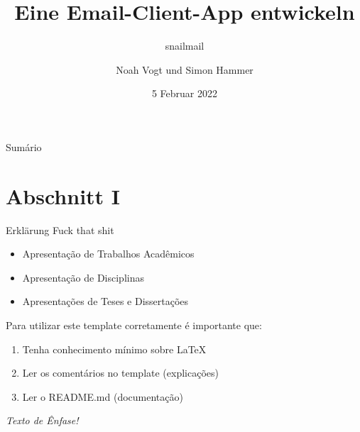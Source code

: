 \documentclass{libs/ufc_format}
\title[\textit{snailmail}]{\textbf{Eine Email-Client-App entwickeln}}
\subtitle{snailmail}
\author{Noah Vogt und Simon Hammer}
\institute[]{
    \ufc
}
\date{5 Februar 2022}
\begin{document}


\begin{frame}{}
    \maketitle
\end{frame}

\begin{frame}{Sumário}
    \begin{multicols}{2}
        \tableofcontents
    \end{multicols}
\end{frame}

\section{Abschnitt I}
\begin{frame}{Erklärung}
    Fuck that shit
    \begin{itemize}
        \item Apresentação de Trabalhos Acadêmicos
        \item Apresentação de Disciplinas
        \item Apresentações de Teses e Dissertações
    \end{itemize}

    \vspace{0.4cm} %
    
    Para utilizar este template corretamente é importante que:
    \begin{enumerate}
        \item Tenha conhecimento mínimo sobre LaTeX
        \item Ler os comentários no template (explicações)
        \item Ler o README.md (documentação)
    \end{enumerate}

    \vspace{0.2cm}

     \emph{Texto de Ênfase!}
\end{frame}
\end{document}
